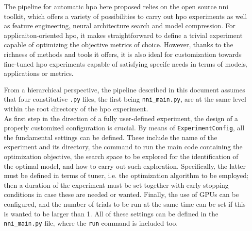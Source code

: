 The pipeline for automatic \gls{hpo} here proposed relies on the open source \gls{nni} toolkit, which offers a variety of possibilities to carry out \gls{hpo} experiments as well as feature engineering, neural architecture search and model compression.
For applicaiton-oriented \gls{hpo}, it makes straightforward to define a trivial experiment capable of optimizing the objective metrics of choice.
However, thanks to the richness of methods and tools it offers, it is also ideal for customization towards fine-tuned \gls{hpo} experiments capable of satisfying specifc needs in terms of models, applications or metrics.

From a hierarchical perspective, the pipeline described in this document assumes that four constitutive \texttt{.py} files, the first being \texttt{nni\_main.py}, are at the same level within the root directory of the \gls{hpo} experiment.\\
As first step in the direction of a fully user-defined experiment, the design of a properly customized configuration is crucial.
By means of \texttt{ExperimentConfig}, all the fundamental settings can be defined.
These include the name of the experiment and its directory, the command to run the main code containing the optimization objective, the search space to be explored for the identification of the optimal model, and how to carry out such exploration. Specifically, the latter must be defined in terms of tuner, i.e. the optimization algorithm to be employed; then a duration of the experiment must be set together with early stopping conditions in case these are needed or wanted. Finally, the use of GPUs can be configured, and the number of trials to be run at the same time can be set if this is wanted to be larger than 1.
All of these settings can be defined in the \texttt{nni\_main.py} file, where the \texttt{run} command is included too.

